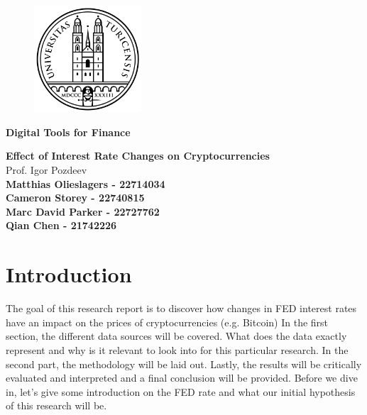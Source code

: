 \documentclass[12pt]{article}
\begin{document}
\pagestyle{empty}

\bigskip

\begin{figure}[htp]
    \centering
    \includegraphics[width=4cm]{uzh logo 2.png}
    \label{fig:UZH}
\end{figure}

\begin{Large}
	\begin{center}
		\textbf{Digital Tools for Finance}
	\end{center}
\end{Large}

\vspace{2cm}

\begin{large}	
	\begin{center}
		\textbf{Effect of Interest Rate Changes on Cryptocurrencies} \vspace{0.1cm} \\ {Prof. Igor Pozdeev } \vspace{2cm} \\ \textbf{Matthias Olieslagers - 22714034}  \\ \textbf{
Cameron Storey - 22740815} \\
        \textbf{Marc David Parker - 22727762}\\
        \textbf{Qian Chen - 21742226}\\
	\end{center}
\end{large}

\tableofcontents

\newpage

\bigskip
\section{Introduction}

The goal of this research report is to discover how changes in FED interest rates have an impact on the prices of cryptocurrencies (e.g. Bitcoin) \newline
In the first section, the different data sources will be covered. What does the data exactly represent and why is it relevant to look into for this particular research. In the second part, the methodology will be laid out. Lastly, the results will be critically evaluated and interpreted and a final conclusion will be provided. 
\newline Before we dive in, let's give some introduction on the FED rate and what our initial hypothesis of this research will be. \newline 
\end{document}
